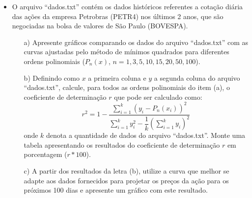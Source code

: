 \documentclass{article}
\newcounter{execs}
\newcommand{\exec}[0]{\addtocounter{execs}{1}\item[\textbf{\arabic{execs}.}]}
\begin{document}
\thispagestyle{first}
%    

\begin{itemize}

\exec O arquivo ``dados.txt'' contém os dados históricos referentes a cotação diária das ações da empresa Petrobras (PETR4) nos últimos 2 anos, que são negociadas na bolsa de valores de São Paulo (BOVESPA). 

\begin{itemize}

\item[a)] Apresente gráficos comparando os dados do arquivo ``dados.txt'' com as curvas ajustadas pelo método de mínimos quadrados para diferentes ordens polinomiais ($P_n(x)$, $n=1,3,5,10,15,20,50,100$).

\item[b)] Definindo como $x$ a primeira coluna e $y$ a segunda coluna do arquivo ``dados.txt'', calcule, para todos as ordens polinomiais do item (a), o coeficiente de determinação $r$ que pode ser calculado como:
$$
r^2= 1 - \dfrac{\displaystyle \sum_{i=1}^{k} \left(y_i-P_n(x_i) \right)^2}{\displaystyle \sum_{i=1}^{k} y_i^2 - \dfrac{1}{k} \left(\sum_{i=1}^{k} y_i \right)^2 }
$$
onde $k$ denota a quantidade de dados do arquivo ``dados.txt''. Monte uma tabela apresentando os resultados do coeficiente de determinação $r$ em porcentagem ($r*100$).

\item[c)] A partir dos resultados da letra (b), utilize a curva que melhor se adapte aos dados fornecidos para projetar os preços da ação para os próximos 100 dias e apresente um gráfico com este resultado. 

\end{itemize}

\end{itemize}
\end{document}
